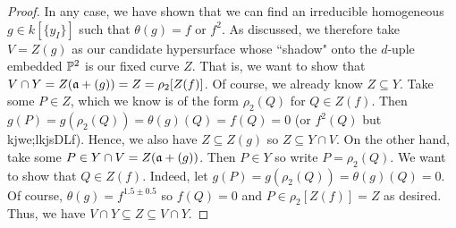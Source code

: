 \begin{proof}
    In any case, we have shown that we can find an irreducible homogeneous $g \in k[\{y_I\}]$ such that $\theta(g) = f$ or $f^2$. As discussed, we therefore take $V = Z(g)$ as our candidate hypersurface whose ``shadow" onto the $d$-uple embedded $\P^2$ is our fixed curve $Z$. That is, we want to show that $V \cap Y = Z(\a + (g)) = Z = \rho_2[Z(f)]$. Of course, we already know $Z \subseteq Y$. Take some $P \in Z$, which we know is of the form $\rho_2(Q)$ for $Q \in Z(f)$. Then $g(P) = g(\rho_2(Q)) = \theta(g)(Q) = f(Q) = 0$ (or $f^2(Q)$ but kjwe;lkjsDLf). Hence, we also have $Z \subseteq Z(g)$ so $Z \subseteq Y \cap V$. On the other hand, take some $P \in Y \cap V = Z(\a + (g))$. Then $P \in Y$ so write $P = \rho_2(Q)$. We want to show that $Q \in Z(f)$. Indeed, let $g(P) = g(\rho_2(Q)) = \theta(g)(Q) = 0$. Of course, $\theta(g) = f^{1.5 \pm 0.5}$ so $f(Q) = 0$ and $P \in \rho_2[Z(f)] = Z$ as desired. Thus, we have $V \cap Y \subseteq Z \subseteq V \cap Y$.
\end{proof}
